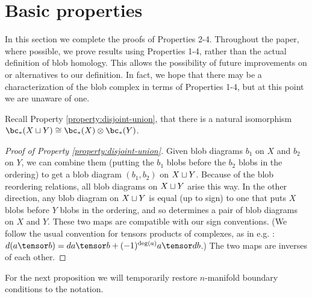 
\section{Basic properties}
\label{sec:basic-properties}

In this section we complete the proofs of Properties 2-4.
Throughout the paper, where possible, we prove results using Properties 1-4, 
rather than the actual definition of blob homology.
This allows the possibility of future improvements on or alternatives to our definition.
In fact, we hope that there may be a characterization of the blob complex in 
terms of Properties 1-4, but at this point we are unaware of one.

Recall Property \ref{property:disjoint-union}, 
that there is a natural isomorphism $\bc_*(X \du Y) \cong \bc_*(X) \otimes \bc_*(Y)$.

\begin{proof}[Proof of Property \ref{property:disjoint-union}]
Given blob diagrams $b_1$ on $X$ and $b_2$ on $Y$, we can combine them
(putting the $b_1$ blobs before the $b_2$ blobs in the ordering) to get a
blob diagram $(b_1, b_2)$ on $X \sqcup Y$.
Because of the blob reordering relations, all blob diagrams on $X \sqcup Y$ arise this way.
In the other direction, any blob diagram on $X\sqcup Y$ is equal (up to sign)
to one that puts $X$ blobs before $Y$ blobs in the ordering, and so determines
a pair of blob diagrams on $X$ and $Y$.
These two maps are compatible with our sign conventions.
(We follow the usual convention for tensors products of complexes, 
as in e.g. \cite{MR1438306}: $d(a \tensor b) = da \tensor b + (-1)^{\deg(a)} a \tensor db$.)
The two maps are inverses of each other.
\end{proof}

For the next proposition we will temporarily restore $n$-manifold boundary
conditions to the notation.

